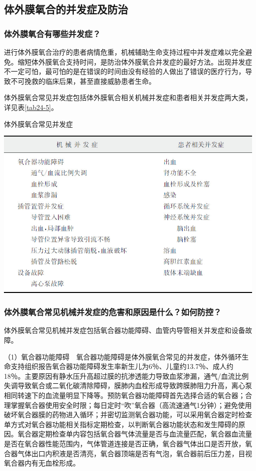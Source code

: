\subsection{体外膜氧合的并发症及防治}

\subsubsection{体外膜氧合有哪些并发症？}

进行体外膜氧合治疗的患者病情危重，机械辅助生命支持过程中并发症难以完全避免。缩短体外膜氧合支持时间，是防治体外膜氧合并发症的最好方法。出现并发症不一定可怕，最可怕的是在错误的时间由没有经验的人做出了错误的医疗行为，导致不可挽救的临床后果，甚至直接威胁患者生命。

体外膜氧合常见并发症包括体外膜氧合相关机械并发症和患者相关并发症两大类，详见表\ref{tab24-5}。

\begin{table}[htbp]
\centering
\caption{体外膜氧合常见并发症}
\label{tab24-5}
\includegraphics{./images/Image00288.jpg}
\end{table}

\subsubsection{体外膜氧合常见机械并发症的危害和原因是什么？如何防控？}

体外膜氧合常见机械并发症包括氧合器功能障碍、血管内导管相关并发症和设备故障。

（1）氧合器功能障碍　氧合器功能障碍是体外膜氧合常见的并发症，体外循环生命支持组织报告氧合器功能障碍发生率新生儿为6％、儿童约13.7％、成人约18％。主要原因有静水压升高超过膜的抗渗透能力导致血浆渗漏，通气/血流比例失调导致氧合或二氧化碳清除障碍，膜肺内血栓形成导致跨膜肺阻力升高，离心泵相同转速下的血流量明显下降等。预防氧合器功能障碍首先选择合适的氧合器；合理掌握氧合器使用安全时限；每日定时“吹”氧合器（高流速通气1分钟）；避免使用破坏氧合器膜的药物进入循环；并密切监测氧合器功能，可以采用氧合器定时检查单方式对氧合器功能相关指标定期检查，以判断氧合器功能状态和发生障碍的原因。氧合器定期检查单内容包括氧合器气体流量是否与血流量匹配，氧合器血流量是否在氧合器性能范围内，气体管道连接是否正确，氧合器气体出口是否开放，氧合器气体出口内积液是否清亮，氧合器顶端是否有气泡，氧合器前后压力差，目视氧合器内有无血栓形成。


